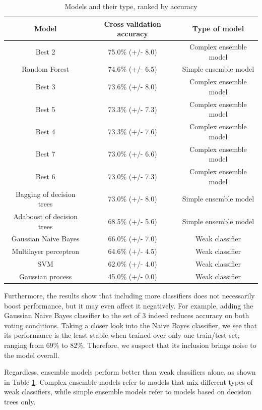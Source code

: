 \documentclass{article}
\begin{document}
\begin{table}[H]
\centering
\begin{tabular}{||c|c|c||}
\hline
\textbf{Model} & \textbf{Cross validation accuracy} & \textbf{Type of model} \\ [0.5ex] 
\hline \hline
Best 2 & 75.0\% (+/- 8.0) & Complex ensemble model \\
Random Forest & 74.6\% (+/- 6.5) & Simple ensemble model \\
Best 3 & 73.6\% (+/- 8.0) & Complex ensemble model \\
Best 5 & 73.3\% (+/- 7.3) & Complex ensemble model \\
Best 4 & 73.3\% (+/- 7.6) & Complex ensemble model \\
Best 7 & 73.0\% (+/- 6.6) & Complex ensemble model  \\
Best 6 & 73.0\% (+/- 7.3) & Complex ensemble model \\
Bagging of decision trees & 73.0\% (+/- 8.0) & Simple ensemble model \\ 
Adaboost of decision trees & 68.5\% (+/- 5.6) & Simple ensemble model \\
Gaussian Naive Bayes &66.0\% (+/- 7.0) & Weak classifier \\
Multilayer perceptron & 64.6\% (+/- 4.5) & Weak classifier \\
SVM & 62.0\% (+/- 4.0) & Weak classifier \\
Gaussian process & 45.0\% (+/- 0.0) & Weak classifier \\
\hline 
\end{tabular}
\caption{Models and their type, ranked by accuracy}
\label{table:rankingModels}
\end{table}

Furthermore, the results show that including more classifiers does not necessarily boost performance, but it may even affect it negatively. For example, adding the Gaussian Naive Bayes classifier to the set of 3 indeed reduces accuracy on both voting conditions. Taking a closer look into the Naive Bayes classifier, we see that its performance is the least stable when trained over only one train/test set, ranging from 69\% to 82\%. Therefore, we suspect that its inclusion brings noise to the model overall. 

Regardless, ensemble models perform better than weak classifiers alone, as shown in Table \ref{table:rankingModels}. Complex ensemble models refer to models that mix different types of weak classifiers, while simple ensemble models refer to models based on decision trees only. 
\end{document}
